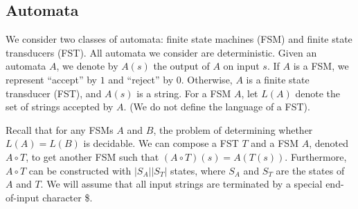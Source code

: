 \documentclass{llncs}
\begin{document}
  \subsection{Automata}
    We consider two classes of automata: finite state machines (FSM) and finite
    state transducers (FST). All automata we consider are deterministic. Given an
    automata $A$, we denote by $A(s)$ the output of $A$ on input $s$. If $A$ is a
    FSM, we represent ``accept'' by $1$ and ``reject'' by $0$. Otherwise, $A$ is a
    finite state transducer (FST), and $A(s)$ is a string. For a FSM $A$, let $L(A)$
    denote the set of strings accepted by $A$. (We do not define the language of a
    FST).

    Recall that for any FSMs $A$ and $B$, the problem of determining whether $L(A) =
    L(B)$ is decidable. We can compose a FST $T$ and a FSM $A$, denoted $A \circ T$,
    to get another FSM such that $(A\circ T)(s) = A(T(s))$.
    Furthermore, $A\circ T$ can be constructed with $|S_A||S_T|$ states,
    where $S_A$ and $S_T$ are the states of $A$ and $T$.
    We will assume that all input strings are terminated by a special end-of-input character \$.

%
%


\end{document}
